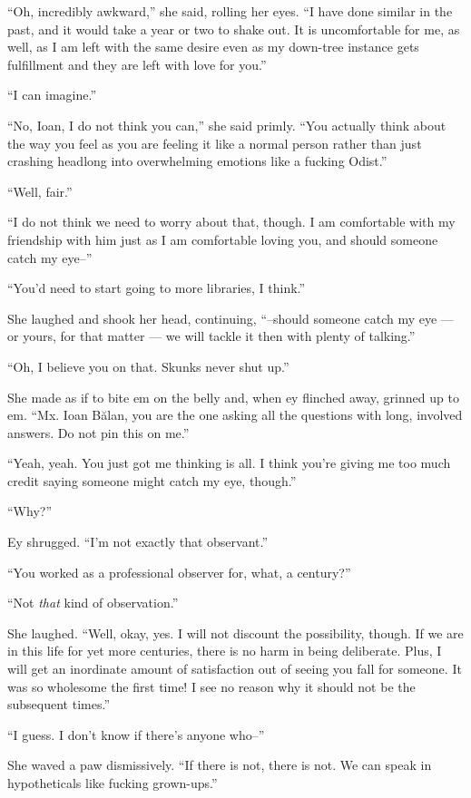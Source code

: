 ``Oh, incredibly awkward,'' she said, rolling her eyes. ``I have done similar in the past, and it would take a year or two to shake out. It is uncomfortable for me, as well, as I am left with the same desire even as my down-tree instance gets fulfillment and they are left with love for you.''

``I can imagine.''

``No, Ioan, I do not think you can,'' she said primly. ``You actually think about the way you feel as you are feeling it like a normal person rather than just crashing headlong into overwhelming emotions like a fucking Odist.''

``Well, fair.''

``I do not think we need to worry about that, though. I am comfortable with my friendship with him just as I am comfortable loving you, and should someone catch my eye--''

``You'd need to start going to more libraries, I think.''

She laughed and shook her head, continuing, ``--should someone catch my eye — or yours, for that matter — we will tackle it then with plenty of talking.''

``Oh, I believe you on that. Skunks never shut up.''

She made as if to bite em on the belly and, when ey flinched away, grinned up to em. ``Mx. Ioan Bălan, you are the one asking all the questions with long, involved answers. Do not pin this on me.''

``Yeah, yeah. You just got me thinking is all. I think you're giving me too much credit saying someone might catch my eye, though.''

``Why?''

Ey shrugged. ``I'm not exactly that observant.''

``You worked as a professional observer for, what, a century?''

``Not \emph{that} kind of observation.''

She laughed. ``Well, okay, yes. I will not discount the possibility, though. If we are in this life for yet more centuries, there is no harm in being deliberate. Plus, I will get an inordinate amount of satisfaction out of seeing you fall for someone. It was so wholesome the first time! I see no reason why it should not be the subsequent times.''

``I guess. I don't know if there's anyone who--''

She waved a paw dismissively. ``If there is not, there is not. We can speak in hypotheticals like fucking grown-ups.''

